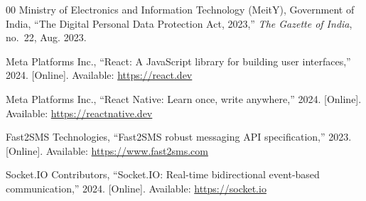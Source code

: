 \documentclass[conference]{IEEEtran}
\begin{document}
\begin{thebibliography}{00}
Ministry of Electronics and Information Technology (MeitY), Government of India, ``The Digital Personal Data Protection Act, 2023,'' \textit{The Gazette of India}, no.~22, Aug. 2023.

Meta Platforms Inc., ``React: A JavaScript library for building user interfaces,'' 2024. [Online]. Available: \url{https://react.dev}

Meta Platforms Inc., ``React Native: Learn once, write anywhere,'' 2024. [Online]. Available: \url{https://reactnative.dev}

Fast2SMS Technologies, ``Fast2SMS robust messaging API specification,'' 2023. [Online]. Available: \url{https://www.fast2sms.com}

Socket.IO Contributors, ``Socket.IO: Real-time bidirectional event-based communication,'' 2024. [Online]. Available: \url{https://socket.io}
\end{thebibliography}
\end{document}
